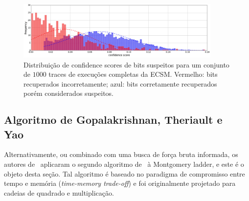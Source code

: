 \begin{figure}[h!tb]
	\centering   %
	\includegraphics[width=0.9\textwidth]{figures/SAC_2016__pointer_cswap_attack__hist-conf-all-traces__n_trset_40.png}
	\caption{
	Distribuição de confidence scores de bits suspeitos para um conjunto de $1000$ traces de execuções completas da ECSM. Vermelho: bits recuperados incorretamente; azul: bits corretamente recuperados porém considerados suspeitos.
	}
	\vspace{.5mm}
	\label{fig:hist-conf-all-traces__n_trset_40}
\end{figure}

\subsection{Algoritmo de Gopalakrishnan, Theriault e Yao~\cite{GopalakrishnanTheriaultYao07}} %

Alternativamente, ou combinado com uma busca de força bruta informada, os autores de~\cite{Nascimento2016_SAC} aplicaram o segundo algoritmo de~\cite{Gopalakrishnan2007} à Montgomery ladder, e este é o objeto desta seção. Tal algoritmo é baseado no paradigma de compromisso entre tempo e memória (\textit{time-memory trade-off}) e foi originalmente projetado para cadeias de quadrado e multiplicação.



